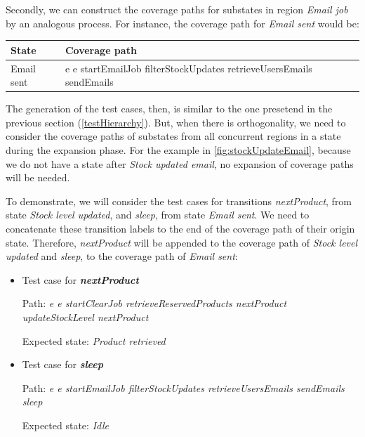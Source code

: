 Secondly, we can construct the coverage paths for substates in region \textit{Email job} by an analogous process. For instance, the coverage path for \textit{Email sent} would be:

\begin{center}
\begin{tabular}{| p{4cm} | p{10cm}|}

\hline

State & Coverage path \\ \hline

Email sent & e e  startEmailJob filterStockUpdates retrieveUsersEmails sendEmails\\ 
\hline
\end{tabular}
\end{center}

The generation of the test cases, then, is similar to the one presetend in the previous section (\ref{testHierarchy}). But, when there is orthogonality, we need to consider the coverage paths of substates from all concurrent regions in a state during the expansion phase. For the example in \ref{fig:stockUpdateEmail}, because we do not have a state after \textit{Stock updated email}, no expansion of coverage paths will be needed.

To demonstrate, we will consider the test cases for transitions \textit{nextProduct}, from state \textit{Stock level updated}, and \textit{sleep}, from state \textit{Email sent}. We need to concatenate these transition labels to the end of the coverage path of their origin state. Therefore, \textit{nextProduct} will be appended to the coverage path of \textit{Stock level updated} and \textit{sleep}, to the coverage path of \textit{Email sent}:

\begin{itemize}

\item Test case for \textit{\textbf{nextProduct}}

Path: \textit{e e startClearJob retrieveReservedProducts nextProduct updateStockLevel nextProduct}

Expected state: \textit{Product retrieved}

\item Test case for \textit{\textbf{sleep}}

Path: \textit{e e  startEmailJob filterStockUpdates retrieveUsersEmails sendEmails sleep}

Expected state: \textit{Idle}

\end{itemize}
